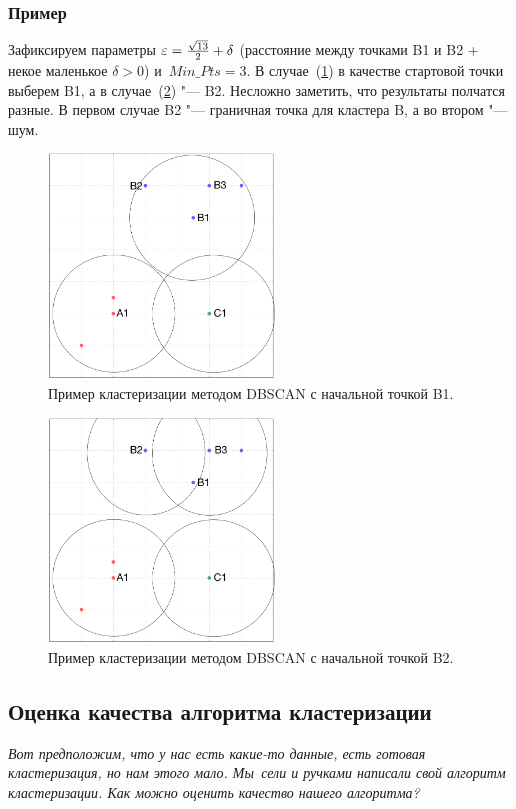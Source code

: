\subsubsection{Пример}
Зафиксируем параметры $\varepsilon = \frac{\sqrt{13}}{2} + \delta$ (расстояние между точками B1 и B2 + некое маленькое $\delta > 0$) и~$Min\_Pts = 3$. В случае~(\ref{DBSCAN1}) в качестве стартовой точки выберем B1, а в случае~(\ref{DBSCAN2}) "--- B2. Несложно заметить, что результаты полчатся разные. 
В первом случае B2 "--- граничная точка для кластера B, 
а во втором "--- шум.
\begin{figure}[H]
\centering
    \includegraphics[width=60mm]{images/DBSCAN1.png}
    \caption{Пример кластеризации методом DBSCAN с начальной точкой B1.}
    \label{DBSCAN1}
\end{figure}
\begin{figure}[H]
\centering
    \includegraphics[width=60mm]{images/DBSCAN2.png}
    \caption{Пример кластеризации методом DBSCAN с начальной точкой B2.}
    \label{DBSCAN2}
\end{figure}


\subsection{Оценка качества алгоритма кластеризации}
{\it Вот предположим, что у нас есть какие-то данные, есть готовая кластеризация, но нам этого мало. Мы~сели и ручками написали свой алгоритм кластеризации. Как можно оценить качество нашего алгоритма?}

